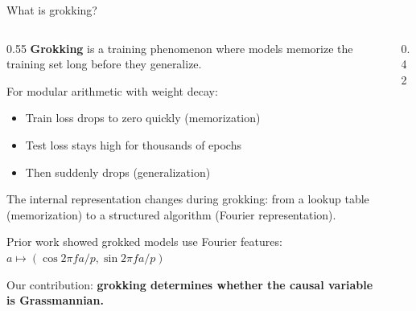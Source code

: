 \documentclass[aspectratio=169,11pt]{beamer}
\begin{document}
\begin{frame}{What is grokking?}

\begin{columns}[T]
\begin{column}{0.55\textwidth}
{\small \textbf{Grokking} is a training phenomenon where models memorize the training set long before they generalize.}

\vspace{0.3em}
{\small For modular arithmetic with weight decay:}
\begin{itemize}
  \item {\small Train loss drops to zero quickly (memorization)}
  \item {\small Test loss stays high for thousands of epochs}
  \item {\small Then suddenly drops (generalization)}
\end{itemize}

\vspace{0.3em}
{\small The internal representation changes during grokking: from a lookup table (memorization) to a structured algorithm (Fourier representation).}

\vspace{0.3em}
{\small Prior work showed grokked models use Fourier features:\\$a \mapsto (\cos 2\pi f a / p, \sin 2\pi f a / p)$}

\vspace{0.3em}
{\small Our contribution: \textbf{grokking determines whether the causal variable is Grassmannian.}}
\end{column}
\begin{column}{0.42\textwidth}
\end{column}
\end{columns}
\end{frame}
\end{document}
